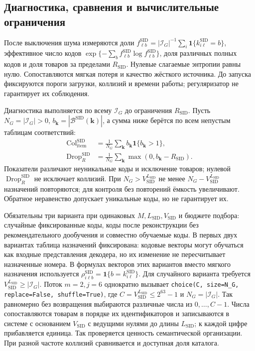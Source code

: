 \documentclass[12pt,a4paper]{article}
\newcommand{\code}[1]{{\ttfamily\small\nolinkurl{#1}}}
\newcommand{\ind}{\mathbf 1}
\theoremstyle{plainru}
\begin{document}
\subsection{Диагностика, сравнения и вычислительные ограничения}
\label{sec:sid-validation}

После выключения шума измеряются доли
$f_{\ell b}^{\mathrm{SID}}=|\mathcal I_G|^{-1}
\sum_i\ind\{k_{i\ell}^{\mathrm{SID}}=b\}$,
эффективное число кодов
$\exp\{-\sum_b f_{\ell b}^{\mathrm{SID}}\log f_{\ell b}^{\mathrm{SID}}\}$,
доля различных полных кодов и доля товаров за пределами
$R_{\mathrm{SID}}$. Нулевые слагаемые энтропии равны нулю.
Сопоставляются мягкая потеря и качество жёсткого источника.
До запуска фиксируются пороги загрузки, коллизий и времени работы;
регуляризатор не гарантирует их соблюдения.

Диагностика выполняется по всему $\mathcal I_G$ до ограничения
$R_{\mathrm{SID}}$. Пусть $N_G=|\mathcal I_G|>0$,
$b_{\mathbf k}=|\mathcal B^{\mathrm{SID}}(\mathbf k)|$,
а сумма ниже берётся по всем непустым таблицам соответствий:
\begin{align}
\operatorname{Col}_{\mathrm{item}}^{\mathrm{SID}}
&=\frac1{N_G}\sum_{\mathbf k}
b_{\mathbf k}\ind\{b_{\mathbf k}>1\},\label{eq:sid-catalog-collisions}\\
\operatorname{Drop}_{R}^{\mathrm{SID}}
&=\frac1{N_G}\sum_{\mathbf k}
\max(0,b_{\mathbf k}-R_{\mathrm{SID}}).\nonumber
\end{align}
Показатели различают неуникальные коды и исключение товаров;
нулевой $\operatorname{Drop}_{R}^{\mathrm{SID}}$ не исключает коллизий.
При $N_G>V_{\mathrm{SID}}^{L_{\mathrm{SID}}}$ не менее
$N_G-V_{\mathrm{SID}}^{L_{\mathrm{SID}}}$ назначений повторяются;
для контроля без повторений ёмкость увеличивают.
Обратное неравенство допускает уникальные коды, но не гарантирует их.

Обязательны три варианта при одинаковых $M,L_{\mathrm{SID}},V_{\mathrm{SID}}$
и бюджете подбора: случайные фиксированные коды, коды после
реконструкции без рекомендательного дообучения и совместно обучаемые
коды. В первых двух вариантах таблица назначений фиксирована:
кодовые векторы могут обучаться как входные представления декодера,
но их изменение не пересчитывает назначенные номера.
В формулах векторов этих вариантов вместо мягкого назначения
используется $\rho_{i\ell b}^{\mathrm{SID}}=\ind\{b=k_{i\ell}^{\mathrm{SID}}\}$.
Для случайного варианта требуется
$V_{\mathrm{SID}}^{L_{\mathrm{SID}}}\ge|\mathcal I_G|$.
Поток $m=2,j=6$ однократно вызывает
\code{choice(C, size=N_G, replace=False, shuffle=True)}, где
$C=V_{\mathrm{SID}}^{L_{\mathrm{SID}}}\le2^{63}-1$ и $N_G=|\mathcal I_G|$.
Так равномерно без возвращения выбираются различные числа из $0,\ldots,C-1$.
Числа сопоставляются товарам
в порядке их идентификаторов и записываются в системе
с основанием $V_{\mathrm{SID}}$ с ведущими нулями до длины
$L_{\mathrm{SID}}$; к каждой цифре прибавляется единица.
Так проверяется ценность семантической организации. При разной
частоте коллизий сравнивается и доступная доля каталога.
\end{document}
